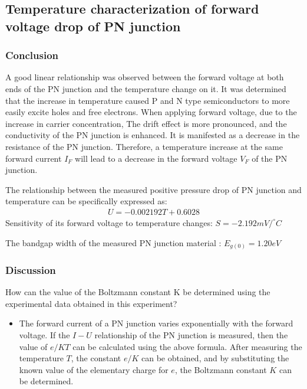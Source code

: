 \documentclass[UTF8]{article}
\begin{document}
	\subsection{Temperature characterization of forward voltage drop of PN junction}
	\subsubsection{Conclusion}
		A good linear relationship was observed between the forward voltage at both ends of the PN junction and the temperature change on it. It was determined that the increase in temperature caused P and N type semiconductors to more easily excite holes and free electrons. When applying forward voltage, due to the increase in carrier concentration, The drift effect is more pronounced, and the conductivity of the PN junction is enhanced. It is manifested as a decrease in the resistance of the PN junction. Therefore, a temperature increase at the same forward current $I_F$ will lead to a decrease in the forward voltage $V_F$ of the PN junction.
	
	The relationship between the measured positive pressure drop of PN junction and temperature can be specifically expressed as:
	\begin{eqnarray}
	U = -0.002192 T + 0.6028
	\end{eqnarray}
	Sensitivity of its forward voltage to temperature changes: $S=-2.192mV/^{\circ}C$
	
	The bandgap width of the measured PN junction material : $E_{g(0)} = 1.20eV$
	
	\subsubsection{Discussion}
	How can the value of the Boltzmann constant K be determined using the experimental data obtained in this experiment?
	\begin{itemize}
	\item The forward current of a PN junction varies exponentially with the forward voltage. If the $I-U$ relationship of the PN junction is measured, then the value of $e/KT$ can be calculated using the above formula. After measuring the temperature $T$, the constant $e/K$ can be obtained, and by substituting the known value of the elementary charge for $e$, the Boltzmann constant $K$ can be determined.
	\end{itemize}
	
\end{document}
